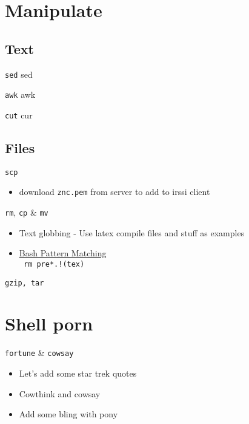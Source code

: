 \documentclass[11pt]{beamer}
\begin{document}
	\section{Manipulate}
		\subsection{Text}
			\begin{frame}{ \texttt{sed}}
				sed
			\end{frame}
			\begin{frame}{ \texttt{awk}}
				awk
			\end{frame}
			\begin{frame}{ \texttt{cut}}
				cur
			\end{frame}

		\subsection{Files}
			\begin{frame}{ \texttt{scp}}
				\begin{itemize}
					\item download \texttt{znc.pem} from server to add to irssi client
				\end{itemize}			
			\end{frame}
			\begin{frame}{ \texttt{rm}, \texttt{cp} \& \texttt{mv}}
				\begin{itemize}
					\item Text globbing - Use latex compile files and stuff as examples
					\item \href{https://www.gnu.org/software/bash/manual/bashref.html#Pattern-Matching}{Bash Pattern Matching} \\
						\texttt{ rm pre*.!(tex) }
				\end{itemize}	
			\end{frame}
			\begin{frame}{ \texttt{gzip, tar}}
				
			\end{frame}

	\section{Shell porn}
		\begin{frame}{\texttt{fortune} \& \texttt{cowsay}}
			\begin{itemize}
				\item Let's add some star trek quotes
				\item Cowthink and cowsay
				\item Add some bling with pony
			\end{itemize}
		\end{frame}
\end{document}
